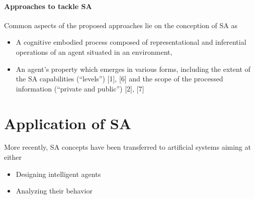 \documentclass{article}
\begin{document}
			\paragraph{Approaches to tackle SA} Common aspects of the proposed approaches lie on the conception of SA as 
			\begin{itemize}
				\item A cognitive embodied process composed of representational and inferential operations of an agent situated in an environment,
				\item An agent’s property which emerges in various forms, including the extent of the SA capabilities (“levels”) \citet{regazzoni-2020-multi-sensorial-generative-and-descriptive-self-awareness-models-for-autonomous-systems}[1], \citet{regazzoni-2020-multi-sensorial-generative-and-descriptive-self-awareness-models-for-autonomous-systems}[6] and the scope of the processed information (“private and public”) \citet{regazzoni-2020-multi-sensorial-generative-and-descriptive-self-awareness-models-for-autonomous-systems}[2], \citet{regazzoni-2020-multi-sensorial-generative-and-descriptive-self-awareness-models-for-autonomous-systems}[7]
			\end{itemize}
		
		\section{Application of SA} More recently, SA concepts have been transferred to artificial systems aiming at either 
			\begin{itemize}
				\item Designing intelligent agents
				\item Analyzing their behavior
			\end{itemize}
\end{document}
